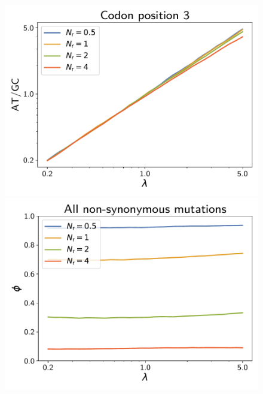 \documentclass{article}
\begin{document}
\begin{figure}[h]
\begin{minipage}{0.32\linewidth}
 \includegraphics[width=\linewidth, page=1]{simulations/at_over_gc_3}
 \end{minipage}
 \hfill
 \begin{minipage}{0.32\linewidth}
 \includegraphics[width=\linewidth, page=1]{simulations/omega}
 \end{minipage}
 \hfill
 \begin{minipage}{0.32\linewidth}

\end{minipage}
\end{figure}
\end{document}
